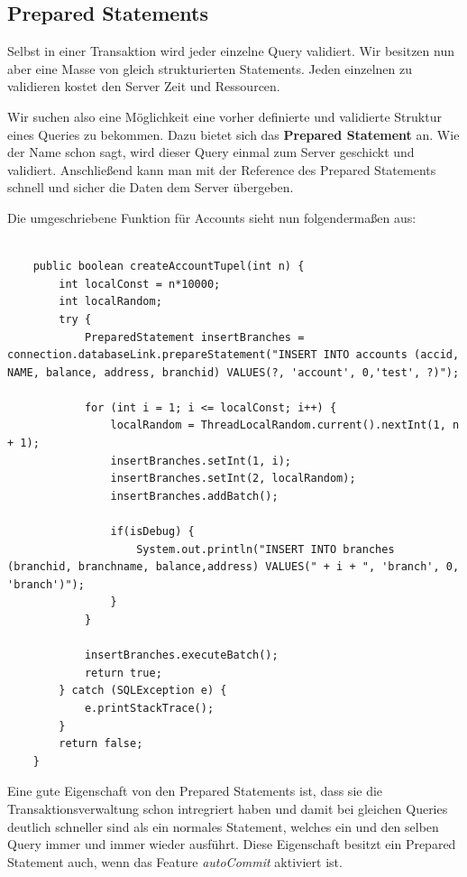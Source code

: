 \subsection{Prepared Statements}
Selbst in einer Transaktion wird jeder einzelne Query validiert. Wir besitzen
nun aber eine Masse von gleich strukturierten Statements. Jeden einzelnen zu
validieren kostet den Server Zeit und Ressourcen.
 
 Wir suchen also eine Möglichkeit eine vorher definierte und validierte Struktur
 eines Queries zu bekommen. Dazu bietet sich das \textbf{Prepared Statement} an.
 Wie der Name schon sagt, wird dieser Query einmal zum Server geschickt und
 validiert. Anschließend kann man mit der Reference des Prepared Statements
 schnell und sicher die Daten dem Server übergeben.
 
Die umgeschriebene Funktion für Accounts sieht nun folgendermaßen aus:
 \begin{lstlisting}

	public boolean createAccountTupel(int n) {
		int localConst = n*10000;
		int localRandom;		
		try {
			PreparedStatement insertBranches = connection.databaseLink.prepareStatement("INSERT INTO accounts (accid, NAME, balance, address, branchid) VALUES(?, 'account', 0,'test', ?)");
			
			for (int i = 1; i <= localConst; i++) {
				localRandom = ThreadLocalRandom.current().nextInt(1, n + 1);
				insertBranches.setInt(1, i);
				insertBranches.setInt(2, localRandom);
				insertBranches.addBatch();
				
				if(isDebug) {
					System.out.println("INSERT INTO branches (branchid, branchname, balance,address) VALUES(" + i + ", 'branch', 0, 'branch')");
				}
			}

			insertBranches.executeBatch();
			return true;
		} catch (SQLException e) {
			e.printStackTrace();
		}
		return false;
	}
 \end{lstlisting}

Eine gute Eigenschaft von den Prepared Statements ist, dass sie die
Transaktionsverwaltung schon intregriert haben und damit bei gleichen Queries
deutlich schneller sind als ein normales Statement, welches ein und den selben
Query immer und immer wieder ausführt. Diese Eigenschaft besitzt ein
Prepared Statement auch, wenn das Feature \textit{autoCommit} aktiviert ist.

